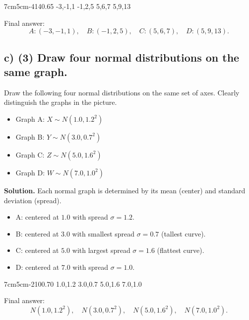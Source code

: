 \TriangularFourGraph
{7cm}{5cm}{-4}{14}{0.65}
{-3,-1,1}
{-1,2,5}
{5,6,7}
{5,9,13}

Final answer:
\[
A:(-3,-1,1),\quad B:(-1,2,5),\quad C:(5,6,7),\quad D:(5,9,13).
\]


\subsection*{c) \textbf{(3)} Draw four normal distributions on the same graph.}
\label{subsec:probability-distribution-graphs-c4-c}
Draw the following four normal distributions on the same set of axes. Clearly distinguish the graphs in the picture.
\begin{itemize}
	\item Graph A: $X\sim N(1.0,1.2^2)$
	\item Graph B: $Y\sim N(3.0,0.7^2)$
	\item Graph C: $Z\sim N(5.0,1.6^2)$
	\item Graph D: $W\sim N(7.0,1.0^2)$
\end{itemize}
\textbf{Solution.}
Each normal graph is determined by its mean (center) and standard deviation (spread).
\begin{itemize}
	\item A: centered at $1.0$ with spread $\sigma=1.2$.
	\item B: centered at $3.0$ with smallest spread $\sigma=0.7$ (tallest curve).
	\item C: centered at $5.0$ with largest spread $\sigma=1.6$ (flattest curve).
	\item D: centered at $7.0$ with spread $\sigma=1.0$.
\end{itemize}

\NormalFourGraph
{7cm}{5cm}{-2}{10}{0.70}
{1.0,1.2}
{3.0,0.7}
{5.0,1.6}
{7.0,1.0}

Final answer:
\[
N(1.0,1.2^2),\quad N(3.0,0.7^2),\quad N(5.0,1.6^2),\quad N(7.0,1.0^2).
\]


